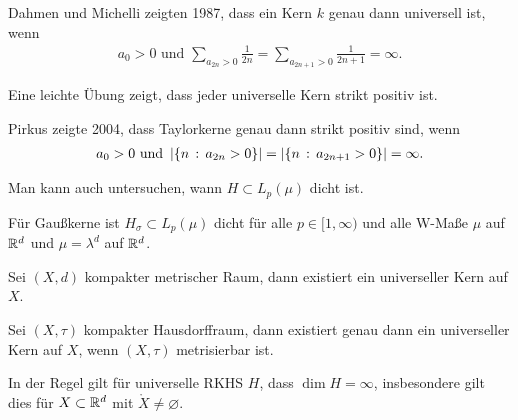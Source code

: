 \begin{bem*}[Bemerkungen.]
\begin{bemenum}
\item
Dahmen und Michelli zeigten 1987, dass ein Kern $k$ genau dann universell ist,
wenn
\begin{align*}
a_0 > 0 \text{ und } \sum_{a_{2n}>0} \frac{1}{2n} = \sum_{a_{2n+1}>0}
\frac{1}{2n+1} = \infty.
\end{align*}
\item Eine leichte Übung zeigt, dass jeder universelle Kern strikt positiv
ist.
\item Pirkus zeigte 2004, dass Taylorkerne genau dann strikt positiv sind, wenn
\begin{align*}
a_0 > 0\text{ und } \left|\left\{ n\,:\,a_{2n} >0\right\}\right| = \left|\left\{ n\,:\,a_{2n+1}>0\right\}\right| =
\infty.
\end{align*}
\item
Man kann auch untersuchen, wann $H\subset L_p(\mu)$ dicht ist.

Für Gaußkerne ist $H_\sigma\subset L_p(\mu)$ dicht für alle
$p\in[1,\infty)$ und alle W-Maße $\mu$ auf $\mathbb{R}^d$ und $\mu=\lambda^d$ auf
$\mathbb{R}^d$.
\item Sei $(X,d)$ kompakter metrischer Raum, dann existiert ein universeller
Kern auf $X$.
\item Sei $(X,\tau)$ kompakter Hausdorffraum, dann existiert genau dann ein
universeller Kern auf $X$, wenn $(X,\tau)$ metrisierbar ist.
\item In der Regel gilt für universelle RKHS $H$, dass $\dim H = \infty$,
insbesondere gilt dies für $X\subset \mathbb{R}^d$ mit $\ocirc{X}\neq
\varnothing$.\maphere
\end{bemenum}
\end{bem*}